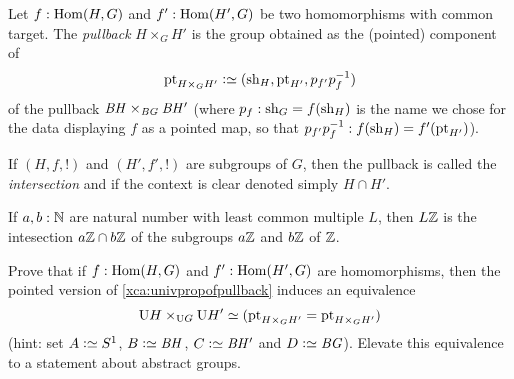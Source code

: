 \begin{definition}
  \label{def:intersectionofgroups}
  Let $f:\Hom(H,G)$ and $f':\Hom(H',G)$ be two homomorphisms with common target.  The \emph{pullback} $H\times_GH'$ is the group obtained as the (pointed) component of 
$$\pt_{H\times_GH'}\defequi(\sh_H,\pt_{H'},p_{f'}p_f^{-1})$$ of the pullback $\mathit{B}\mathit{H}\times_{\mathit{B}\mathit{G}}\mathit{B}\mathit{H}'$ (where $p_f:\mathrm{sh}_G=f(\mathrm{sh}_H)$ is the name we chose for the data displaying $f$ as a pointed map, so that $p_{f'}p_f^{-1}:f(\mathrm{sh}_H)=f'(\mathrm{pt}_{H'})$).

If $(H,f,!)$ and $(H',f',!)$ are subgroups of $G$, then the pullback is called the \emph{intersection} and if the context is clear denoted simply $H\cap H'$.
\end{definition}
\begin{example}
  If $a,b:\mathbb{N}$ are natural number with least common multiple $L$, then $L\mathbb{Z}$ is the intesection $a\mathbb{Z}\cap b\mathbb{Z}$ of the subgroups $a\mathbb{Z}$ and $b\mathbb{Z}$ of $\mathbb{Z}$. 
\end{example}

\begin{xca}
  Prove that if $f:\Hom(H,G)$ and $f':\Hom(H',G)$ are homomorphisms, then the pointed version of \cref{xca:univpropofpullback} induces an equivalence
$$\mathrm{U} H\times_{\mathrm{U} G}\mathrm{U} {H'}
\simeq (\mathrm{pt}_{H\times_GH'}=\mathrm{pt}_{H\times_GH'})
$$
(hint: set $A\defequi S^1$, $B\defequi \BH$, $C\defequi \BH'$ and $D\defequi \BG$).  Elevate this equivalence to a statement about abstract groups.
\end{xca}

